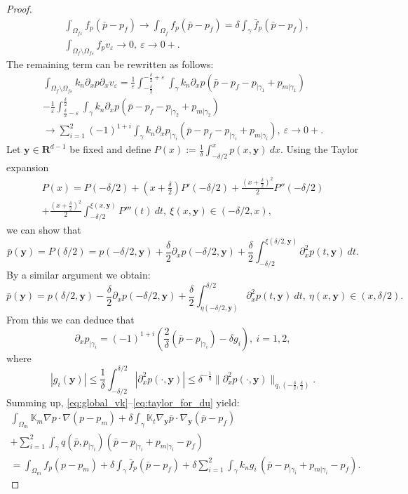 \documentclass[a4paper]{article}
\def\vc#1{\mathbf{\boldsymbol{#1}}}     %
\def\tn#1{{\mathbb{#1}}}    %
\def\ep{\varepsilon}
\def\Real{{\mathbf R}}
\def\norm#1{\|#1\|}
\def\yy{{\vc y}}
\newcommand{\note}[2]{{\color{blue} \textbf{ #1:} \textit{#2}}}
\begin{document}
\begin{proof}
\begin{align}
&\int_{\Omega_{f\ep}} f_p (\bar p-p_f) \to \int_{\Omega_{f}} f_p (\bar p-p_f) = \delta\int_{\gamma} \bar f_p (\bar p-p_f), \\
&\int_{\Omega_f\setminus\Omega_{f\ep}} f_p v_\ep \to 0,~\ep\to 0+.
\end{align}
The remaining term can be rewritten as follows:
\begin{multline}
\int_{\Omega_f\setminus\Omega_{f\ep}} k_n\partial_x p \partial_x v_\ep
= \frac1\ep\int_{-\frac\delta2}^{-\frac\delta2+\ep}\int_\gamma k_n\partial_x p (\bar p - p_f - p_{|\gamma_1} + p_{m|\gamma_1})\\
- \frac1\ep\int_{\frac\delta2-\ep}^{\frac\delta2}\int_\gamma k_n\partial_x p (\bar p - p_f - p_{|\gamma_2} + p_{m|\gamma_2})\\
\to \sum_{i=1}^2(-1)^{1+i}\int_\gamma k_n \partial_x p_{|\gamma_i} (\bar p - p_f - p_{|\gamma_i} + p_{m|\gamma_i}),~\ep\to 0+.
\end{multline}
Let $\vc y\in\Real^{d-1}$ be fixed and define $P(x):=\frac1\delta\int_{-\delta/2}^{x}p(x,\vc y)~dx$.
Using the Taylor expansion 
\begin{multline}
P(x) = P(-\delta/2) + (x+\frac\delta2)P'(-\delta/2) + \frac{(x+\frac\delta2)^2}{2}P''(-\delta/2)\\
+ \frac{(x+\frac\delta2)^2}2\int_{-\delta/2}^{\xi(x,\vc y)}P'''(t)~dt,~\xi(x,\vc y)\in(-\delta/2,x),
\end{multline}
we can show that
\[ \bar p(\vc y) = P(\delta/2) = p(-\delta/2,\vc y) + \frac\delta2\partial_x p(-\delta/2,\vc y) + \frac\delta2\int_{-\delta/2}^{\xi(\delta/2,\vc y)}\partial_x^2 p(t,\vc y)~dt. \]
By a similar argument we obtain:
\[ \bar p(\vc y) = p(\delta/2,\vc y) - \frac\delta2\partial_x p(-\delta/2,\vc y) + \frac\delta2\int_{\eta(-\delta/2,\vc y)}^{\delta/2}\partial_x^2 p(t,\vc y)~dt,~\eta(x,\vc y)\in(x,\delta/2). \]
From this we can deduce that
\begin{equation}
\label{eq:taylor_for_du}
\partial_x p_{|\gamma_i} = (-1)^{1+i}\left(\frac2\delta(\bar p - p_{|\gamma_i}) - \delta g_i\right),~i=1,2,
\end{equation}
where
\[ |g_i(\vc y)| \le \frac1\delta\int_{-\delta/2}^{\delta/2} |\partial_x^2 p(\cdot,\vc y)| \le \delta^{-\frac1q}\norm{\partial_x^2 p(\cdot,\vc y)}_{q,(-\frac\delta2,\frac\delta2)}. \]
Summing up, \eqref{eq:global_vk}--\eqref{eq:taylor_for_du} yield:
\begin{multline}
\label{eq:sum_global_vk_limit}
\int_{\Omega_m}\tn K_m\nabla p\cdot\nabla(p-p_m)
+\delta\int_\gamma\tn K_t\nabla_\yy\bar p\cdot\nabla_\yy(\bar p-p_f)\\
+ \sum_{i=1}^2\int_\gamma q(\bar p,p_{|\gamma_i}) (\bar p - p_{|\gamma_i} + p_{m|\gamma_i} - p_f)\\
= \int_{\Omega_m} f_p (p-p_m)
+ \delta\int_{\gamma} \bar f_p (\bar p-p_f)
+ \delta\sum_{i=1}^2\int_\gamma k_n g_i\, (\bar p - p_{|\gamma_i} + p_{m|\gamma_i} - p_f).
\end{multline}


\end{proof}
\end{document}
